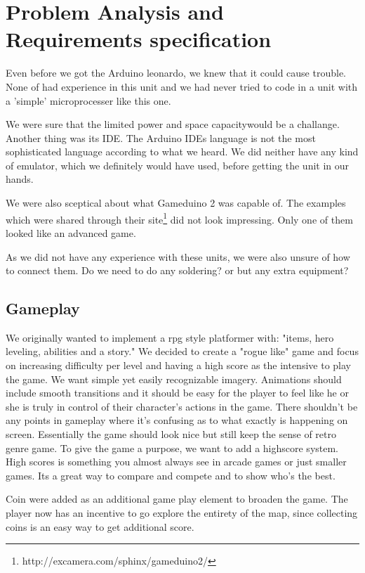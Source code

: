 \chapter{Problem Analysis and Requirements specification}


Even before we got the Arduino leonardo, we knew that it could cause trouble. None of had experience in this unit and
we had never tried to code in a unit with a 'simple'
microprocesser like this one.

We were sure that the limited power and space capacitywould be a challange. Another thing was its IDE. The Arduino IDEs language is not the most
sophisticated language according to what we heard. We did neither have any kind of emulator, which we definitely would have used, before getting the unit in our hands.

We were also sceptical about what Gameduino 2 was capable of. The examples
which were shared through their site\footnote{http://excamera.com/sphinx/gameduino2/} did not look impressing. Only one of them
looked like an advanced game.

As we did not have any experience with these units, we were also unsure of how to connect them. Do we need to do any soldering? or but any extra equipment?

\newpage

\section{Gameplay}%
We originally wanted to implement a rpg style platformer with: "items, hero leveling, abilities and a story."
We decided to create a "rogue like" game and focus on increasing difficulty per level and having a high score as the intensive to play the game.
We want simple yet easily recognizable imagery. Animations should include smooth transitions and it should be easy for the player to feel like he or she is truly in control of their character's actions in the game. There shouldn't be any points in gameplay where it's confusing as to what exactly is happening on screen. Essentially the game should look nice but still keep the sense of retro genre game.
To give the game a purpose, we want to add a highscore system.
High scores is something you almost always see in arcade games or just smaller games. Its a great way to compare and compete and to show who's the best.

Coin were added as an additional game play element to broaden the game. The player now has an incentive to go explore the entirety of the map, since collecting coins is an easy way to get additional score.
